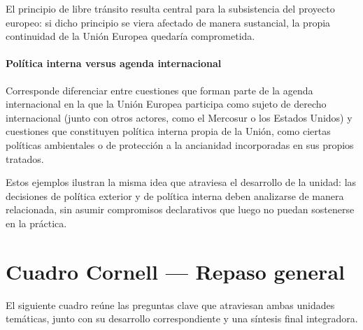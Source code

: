\documentclass[12pt,oneside]{book}
\begin{document}
\begin{important}
El principio de libre tránsito resulta central para la subsistencia del proyecto europeo: si dicho principio se viera afectado de manera sustancial, la propia continuidad de la Unión Europea quedaría comprometida.
\end{important}

\subsubsection{Política interna versus agenda internacional}

Corresponde diferenciar entre cuestiones que forman parte de la agenda internacional en la que la Unión Europea participa como sujeto de derecho internacional (junto con otros actores, como el Mercosur o los Estados Unidos) y cuestiones que constituyen política interna propia de la Unión, como ciertas políticas ambientales o de protección a la ancianidad incorporadas en sus propios tratados.


Estos ejemplos ilustran la misma idea que atraviesa el desarrollo de la unidad: las decisiones de política exterior y de política interna deben analizarse de manera relacionada, sin asumir compromisos declarativos que luego no puedan sostenerse en la práctica.

\chapter{Cuadro Cornell — Repaso general}

El siguiente cuadro reúne las preguntas clave que atraviesan ambas unidades temáticas, junto con su desarrollo correspondiente y una síntesis final integradora.
\end{document}
